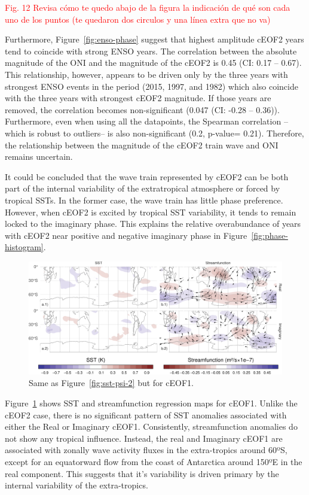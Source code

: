 \documentclass[smallextended]{svjour3}       %
\begin{document}
\textcolor{red}{Fig. 12 Revisa cómo te quedo abajo de la figura la indicación de qué son cada uno de los puntos (te quedaron dos circulos y una línea extra que no va)}

Furthermore, Figure~\ref{fig:enso-phase} suggest that highest amplitude cEOF2 years tend to coincide with strong ENSO years.
The correlation between the absolute magnitude of the ONI and the magnitude of the cEOF2 is 0.45 (CI: 0.17 -- 0.67).
This relationship, however, appears to be driven only by the three years with strongest ENSO events in the period (2015, 1997, and 1982) which also coincide with the three years with strongest cEOF2 magnitude.
If those years are removed, the correlation becomes non-significant (0.047 (CI: -0.28 -- 0.36)).
Furthermore, even when using all the datapoints, the Spearman correlation --which is robust to outliers-- is also non-significant (0.2, p-value= 0.21).
Therefore, the relationship between the magnitude of the cEOF2 train wave and ONI remains uncertain.

It could be concluded that the wave train represented by cEOF2 can be both part of the internal variability of the extratropical atmosphere or forced by tropical SSTs.
In the former case, the wave train has little phase preference.
However, when cEOF2 is excited by tropical SST variability, it tends to remain locked to the imaginary phase.
This explains the relative overabundance of years with cEOF2 near positive and negative imaginary phase in Figure~\ref{fig:phase-histogram}.



\begin{figure}
\includegraphics{../figures/sst-psi-1-1} \caption{Same as Figure~\ref{fig:sst-psi-2} but for cEOF1.}\label{fig:sst-psi-1}
\end{figure}

Figure~\ref{fig:sst-psi-1} shows SST and streamfunction regression maps for cEOF1.
Unlike the cEOF2 case, there is no significant pattern of SST anomalies associated with either the Real or Imaginary cEOF1.
Consistently, streamfunction anomalies do not show any tropical influence.
Instead, the real and Imaginary cEOF1 are associated with zonally wave activity fluxes in the extra-tropics around 60ºS, except for an equatorward flow from the coast of Antarctica around 150ºE in the real component.
This suggests that it's variability is driven primary by the internal variability of the extra-tropics.
\end{document}

